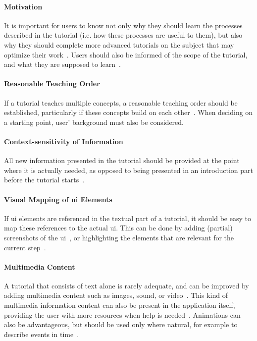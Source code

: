 \paragraph{Motivation} It is important for users to know not only why they should learn the processes described in the tutorial (i.e. how these processes are useful to them), but also why they should complete more advanced tutorials on the subject that may optimize their work~\cite{grossman:software_learnability}. Users should also be informed of the scope of the tutorial, and what they are supposed to learn~\cite{bowerman:tutorial_design}.

\paragraph{Reasonable Teaching Order} If a tutorial teaches multiple concepts, a reasonable teaching order should be established, particularly if these concepts build on each other~\cite{bowerman:tutorial_design}. When deciding on a starting point, user' background must also be considered.

\paragraph{Context-sensitivity of Information} All new information presented in the tutorial should be provided at the point where it is actually needed, as opposed to being presented in an introduction part before the tutorial starts~\cite{andersen:tutorials_impact}.

\paragraph{Visual Mapping of \gls{ui} Elements} If \gls{ui} elements are referenced in the textual part of a tutorial, it should be easy to map these references to the actual \gls{ui}. This can be done by adding (partial) screenshots of the \gls{ui}~\cite{huang:graphstract}, or highlighting the elements that are relevant for the current step~\cite{kelleher:stencils, bergman:docwizards, grabler:photo_tutorials}.

\paragraph{Multimedia Content} A tutorial that consists of text alone is rarely adequate, and can be improved by adding multimedia content such as images, sound, or video~\cite{grossman:software_learnability}. This kind of multimedia information content can also be present in the application itself, providing the user with more resources when help is needed~\cite{grossman:toolclips}. Animations can also be advantageous, but should be used only where natural, for example to describe events in time~\cite{morrison:animation}.

